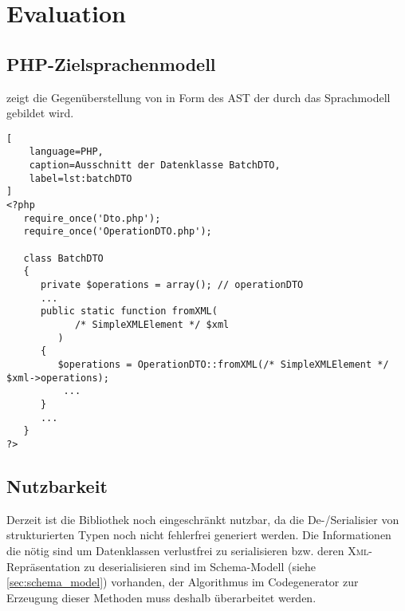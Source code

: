 \chapter{Evaluation}
\label{chap:evaluation}



\section{PHP-Zielsprachenmodell}
\label{sec:php_target_language_model}

 zeigt die Gegenüberstellung von  in Form des \gls{AST} der durch das Sprachmodell gebildet wird. 

\begin{lstlisting}[
    language=PHP,
    caption=Ausschnitt der Datenklasse BatchDTO,
    label=lst:batchDTO
]
<?php
   require_once('Dto.php');
   require_once('OperationDTO.php');

   class BatchDTO
   {
      private $operations = array(); // operationDTO 
      ...
      public static function fromXML(
            /* SimpleXMLElement */ $xml
         )
      {
         $operations = OperationDTO::fromXML(/* SimpleXMLElement */ $xml->operations);
          ...
      }
      ...
   }
?>
\end{lstlisting}

\begin{sidewaysfigure}
    \centering
    \resizebox{1.05\textheight}{!}{
      
    }
    \caption{Darstellung von BatchDTO aus  im Sprachenmodell}
    \label{fig:modelRepresentationOfBatchDTO}
\end{sidewaysfigure}

\section{Nutzbarkeit}
\label{sec:usability}

Derzeit ist die Bibliothek noch eingeschränkt nutzbar, da die De-/Serialisier von strukturierten Typen noch nicht fehlerfrei generiert werden. Die Informationen die nötig sind um Datenklassen verlustfrei zu serialisieren bzw. deren \textsc{Xml}-Repräsentation zu deserialisieren sind im Schema-Modell (siehe \cref{sec:schema_model}) vorhanden, der Algorithmus im Codegenerator zur Erzeugung dieser Methoden muss deshalb überarbeitet werden.

